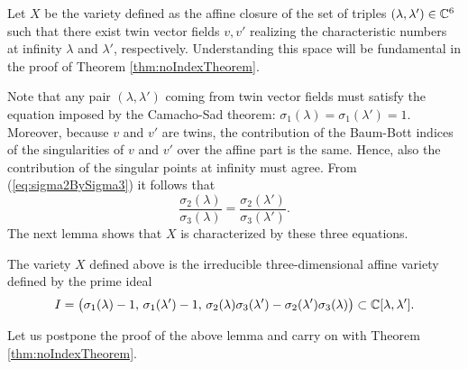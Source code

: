 \documentclass[phd,tocprelim]{cornell}
\begin{document}
Let $X$ be the variety defined as the affine closure of the set of triples $(\lambda,\lambda')\in\mathbb{C}^6$ such that there exist twin vector fields $v,v'$ realizing the characteristic numbers at infinity $\lambda$ and $\lambda'$, respectively. Understanding this space will be fundamental in the proof of Theorem \ref{thm:noIndexTheorem}.

Note that any pair $(\lambda,\lambda')$ coming from twin vector fields must satisfy the equation imposed by the Camacho-Sad theorem: $\sigma_1(\lambda)=\sigma_1(\lambda')=1$. Moreover, because $v$ and $v'$ are twins, the contribution of the Baum-Bott indices of the singularities of $v$ and $v'$ over the affine part is the same. Hence, also the contribution of the singular points at infinity must agree. From (\ref{eq:sigma2BySigma3}) it follows that
 \begin{equation}\label{eq:equalBB}
  \frac{\sigma_2(\lambda)}{\sigma_3(\lambda)} = \frac{\sigma_2(\lambda')}{\sigma_3(\lambda')} .
 \end{equation}
The next lemma shows that $X$ is characterized by these three equations.

\begin{lemma}\label{lemma:Xis3D}
 The variety $X$ defined above is the irreducible three-dimensional affine variety defined by the prime ideal
  \[ I = \big( \sigma_1(\lambda)-1,\, \sigma_1(\lambda')-1,\,  \sigma_2(\lambda)\sigma_3(\lambda')-\sigma_2(\lambda')\sigma_3(\lambda) \big) \subset \mathbb{C}[\lambda,\lambda']. \]
\end{lemma}

Let us postpone the proof of the above lemma and carry on with Theorem \ref{thm:noIndexTheorem}.
\end{document}
